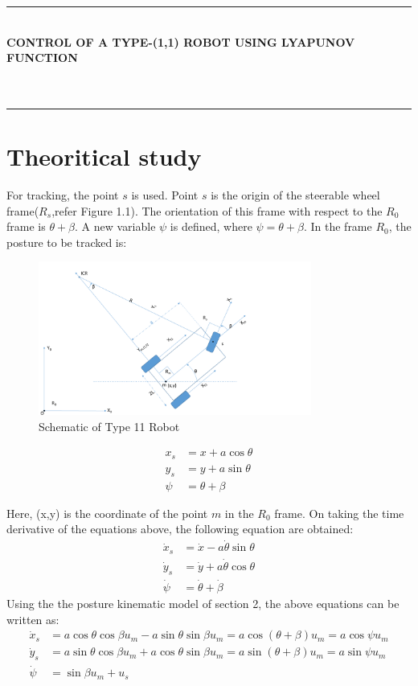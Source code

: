 \documentclass{article}
\newcommand{\hmwkTitle}{}
\newcommand{\hmwkDueDate}{}
\newcommand{\hmwkClass}{Control of a Type-(1,1) Robot using Lyapunov Function}
\begin{document}
\clearpage
\thispagestyle{empty}
\clearpage
\noindent\rule{\textwidth}{0.4pt} \\
\textbf{\MakeUppercase{\hmwkClass}} \\
\textbf{\MakeUppercase{\hmwkTitle}} \\
\hmwkDueDate \\

\noindent\rule{\textwidth}{0.4pt}



\section{Theoritical study}
For tracking, the point $s$ is used. Point $s$ is the origin of the steerable wheel frame($R_s$,refer Figure 1.1). The orientation of this frame with respect to the 
$R_0$ frame is $\theta+\beta$. A new variable $\psi$ is defined, where $\psi=\theta+\beta$. In the frame $R_0$, the posture to be tracked is:
\begin{figure}[H]
\centering
\includegraphics[width = 0.8\textwidth]{Figures/figure1.png}
\caption{Schematic of Type 11 Robot}
\label{fig:figure1}
\end{figure}
\begin{align*} 
x_{s}&=x+a\cos \theta\\ 
y_{s}&=y+a\sin \theta\\
\psi&=\theta + \beta
\end{align*}

Here, (x,y) is the coordinate of the point $m$ in the $R_0$ frame. On taking the time derivative of the equations above, the following equation are obtained:\\
\begin{align*} 
\dot{x}_{s}&=\dot{x}-a\dot{\theta}\sin \theta \\ 
\dot{y}_{s}&=\dot{y}+a\dot{\theta}\cos \theta \\
\dot{\psi}&=\dot{\theta} + \dot{\beta}
\end{align*}
Using the the posture kinematic model of section 2, the above equations can be written as:\\
\begin{align*} 
\dot{x}_{s}&=a\cos \theta \cos \beta u_m - a\sin \theta \sin \beta u_m=a\cos(\theta+\beta) u_m=a\cos \psi u_m\\ 
\dot{y}_{s}&=a\sin \theta \cos \beta u_m+a\cos \theta \sin \beta u_m=a\sin(\theta+\beta) u_m=a\sin \psi u_m\\
\dot{\psi}&=\sin \beta u_m+ u_s
\end{align*}
\end{document}
